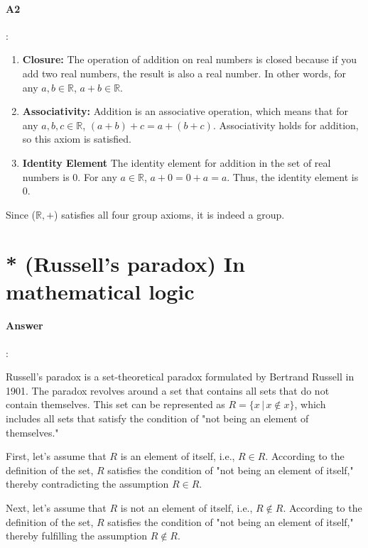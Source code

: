 \documentclass{article}
\begin{document}
\paragraph{A2}:


\begin{enumerate}
  \item \textbf{Closure:} The operation of addition on real numbers is closed because if you add two real numbers, the result is also a real number. In other words, for any $a, b \in \mathbb{R}$, $a + b \in \mathbb{R}$.
  \item \textbf{Associativity:} Addition is an associative operation, which means that for any $a, b, c \in \mathbb{R}$, $(a + b) + c = a + (b + c)$. Associativity holds for addition, so this axiom is satisfied.
  \item \textbf{Identity Element} The identity element for addition in the set of real numbers is 0. For any $a \in \mathbb{R}$, $a + 0 = 0 + a = a$. Thus, the identity element is 0.
\end{enumerate}

Since ($\mathbb{R}, +$) satisfies all four group axioms, it is indeed a group.



\section{* (Russell’s paradox) In mathematical logic}

\paragraph{Answer}:

Russell's paradox is a set-theoretical paradox formulated by Bertrand Russell in 1901. The paradox revolves around a set that contains all sets that do not contain themselves. This set can be represented as $R = \{x \,|\, x \notin x\}$, which includes all sets that satisfy the condition of "not being an element of themselves."

First, let's assume that $R$ is an element of itself, i.e., $R \in R$. According to the definition of the set, $R$ satisfies the condition of "not being an element of itself," thereby contradicting the assumption $R \in R$.

Next, let's assume that $R$ is not an element of itself, i.e., $R \notin R$. According to the definition of the set, $R$ satisfies the condition of "not being an element of itself," thereby fulfilling the assumption $R \notin R$.
\end{document}
